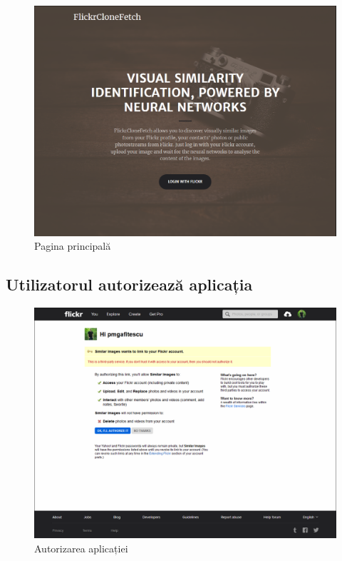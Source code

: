 \begin{figure}[!htbp]
    \begin{center}
        \includegraphics[width=1.0\textwidth]{images/home_page.png}
        \caption{Pagina principală }
    \end{center}
\end{figure}

\pagebreak
\subsection{Utilizatorul autorizează aplicația}

\begin{figure}[!htbp]
    \begin{center}
        \includegraphics[width=1.0\textwidth]{images/authorize.png}
        \caption{Autorizarea aplicației }
    \end{center}
\end{figure}


